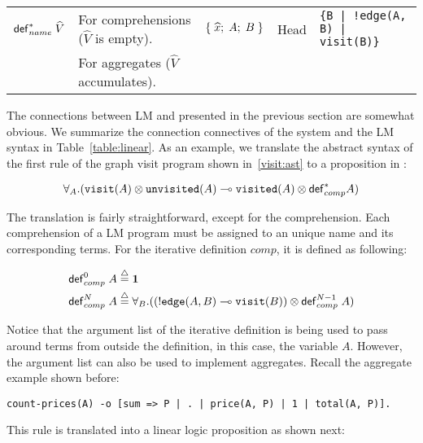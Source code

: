\begin{table*}
\begin{center}
{\begin{tabular}{ | l | l || l | l | l |}
    $\mathsf{def}_{name}^{*} \; \widehat{V}$               & For comprehensions
    ($\widehat{V}$ is empty).  & $\{ \; \widehat{x}; \; A; \; B \; \}$  & Head            & \texttt{\{B | !edge(A, B) | visit(B)\}}        \\
                                 & For aggregates ($\widehat{V}$ accumulates).          &                                               &                 &                                                \\ \hline
    \end{tabular}
}
\end{center}
\caption{Connectives from \fragment and their use in LM.}
\label{table:linear}
\end{table*}

The connections between LM and \fragment presented in the previous section
are somewhat obvious. We summarize the connection connectives of the system and
the LM syntax in Table~\ref{table:linear}. As an example, we translate the
abstract syntax of the first rule of the graph visit program shown
in~\ref{visit:ast} to a proposition in \fragment:

\begin{align}
\forall_A. (\mathtt{visit}(A) \otimes \mathtt{unvisited}(A) \multimap
   \mathtt{visited}(A) \otimes \mathsf{def}_{comp}^{*} A)
\end{align}

The translation is fairly straightforward, except for the comprehension. Each
comprehension of a LM program must be assigned to an unique name and its
corresponding terms. For the iterative definition $comp$, it is defined as
following:

\begin{align}
\iterz{comp}{0} A & \defeq \one\\
\iterz{comp}{N} A & \defeq \forall_B.((\bang \mathtt{edge}(A, B) \lolli
\mathtt{visit}(B)) \otimes \iterz{comp}{N-1} A)
\end{align}

Notice that the argument list of the iterative definition is being used
to pass around terms from outside the definition, in this case, the variable
$A$. However, the argument list can also be used to implement aggregates.
Recall the aggregate example shown before:

{\small
\begin{Verbatim}
count-prices(A) -o [sum => P | . | price(A, P) | 1 | total(A, P)].
\end{Verbatim}
}

This rule is translated into a linear logic proposition as shown next:

